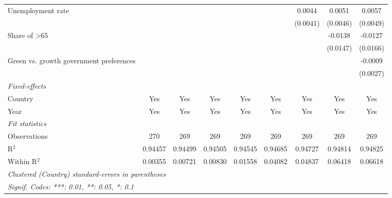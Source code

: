 \begin{table}[htbp]
\begin{tabular}{lcccccccc}
      Unemployment rate                                                 &          &          &          &          &          & 0.0044   & 0.0051   & 0.0057\\   
                                                                        &          &          &          &          &          & (0.0041) & (0.0046) & (0.0049)\\   
      Share of >65                                                      &          &          &          &          &          &          & -0.0138  & -0.0127\\   
                                                                        &          &          &          &          &          &          & (0.0147) & (0.0166)\\   
      Green vs. growth government preferences                           &          &          &          &          &          &          &          & -0.0009\\   
                                                                        &          &          &          &          &          &          &          & (0.0027)\\   
      \midrule
      \emph{Fixed-effects}\\
      Country                                                           & Yes      & Yes      & Yes      & Yes      & Yes      & Yes      & Yes      & Yes\\  
      Year                                                              & Yes      & Yes      & Yes      & Yes      & Yes      & Yes      & Yes      & Yes\\  
      \midrule
      \emph{Fit statistics}\\
      Observations                                                      & 270      & 269      & 269      & 269      & 269      & 269      & 269      & 269\\  
      R$^2$                                                             & 0.94457  & 0.94499  & 0.94505  & 0.94545  & 0.94685  & 0.94727  & 0.94814  & 0.94825\\  
      Within R$^2$                                                      & 0.00355  & 0.00721  & 0.00830  & 0.01558  & 0.04082  & 0.04837  & 0.06418  & 0.06618\\  
      \midrule \midrule
      \multicolumn{9}{l}{\emph{Clustered (Country) standard-errors in parentheses}}\\
      \multicolumn{9}{l}{\emph{Signif. Codes: ***: 0.01, **: 0.05, *: 0.1}}\\
   \end{tabular}
\end{table}


